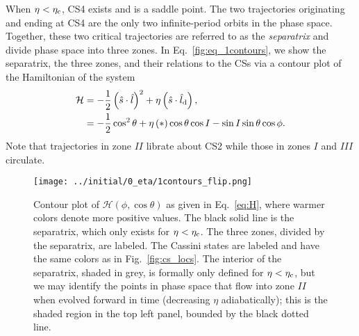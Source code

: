 \documentclass[
        fleqn,
        usenatbib,
        referee,
    ]{mnras}
\newcommand*{\p}[1]{\left(#1\right)}
\begin{document}
When $\eta < \eta_{\rm c}$, CS4 exists and is a saddle point. The two
trajectories originating and ending at CS4 are the only two infinite-period
orbits in the phase space. Together, these two critical trajectories are
referred to as the \emph{separatrix} and divide phase space into three zones. In
Eq.~\eqref{fig:eq_1contours}, we show the separatrix, the three zones, and their
relations to the CSs via a contour plot of the Hamiltonian of the system
\begin{align}
    \mathcal{H} &= -\frac{1}{2}\p{\hat{s} \cdot \hat{l}}^2
            + \eta \p{\hat{s} \cdot \hat{l}_{\rm d}},\label{eq:H}\\
        &= -\frac{1}{2}\cos^2\theta
            + \eta \p*{\cos \theta \cos I - \sin I \sin \theta \cos \phi}.
\end{align}
Note that trajectories in zone $II$ librate about CS2 while those in zones
$I$ and $III$ circulate.
\begin{figure*}
    \centering
    \texttt{[image: ../initial/0\_eta/1contours\_flip.png]}
    \caption{Contour plot of $\mathcal{H}\p{\phi, \cos \theta}$ as given in
    Eq.~\eqref{eq:H}, where warmer colors denote more positive values. The black
    solid line is the separatrix, which only exists for $\eta < \eta_{\rm c}$.
    The three zones, divided by the separatrix, are labeled. The Cassini states
    are labeled and have the same colors as in Fig.~\ref{fig:cs_locs}. The
    interior of the separatrix, shaded in grey, is formally only defined for
    $\eta < \eta_{\rm c}$, but we may identify the points in phase space that
    flow into zone $II$ when evolved forward in time (decreasing $\eta$
    adiabatically); this is the shaded region in the top left panel, bounded by
    the black dotted line.}\label{fig:eq_1contours}
\end{figure*}
\end{document}
